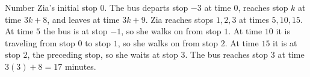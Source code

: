 Number Zia's initial stop $0$. The bus departs stop $-3$ at time $0$, reaches stop $k$ at time $3k+8$, and leaves at time $3k+9$. Zia reaches stops $1,2,3$ at times $5,10,15$. At time $5$ the bus is at stop $-1$, so she walks on from stop $1$. At time $10$ it is traveling from stop $0$ to stop $1$, so she walks on from stop $2$. At time $15$ it is at stop $2$, the preceding stop, so she waits at stop $3$. The bus reaches stop $3$ at time $3(3)+8=\boxed{17}$ minutes.
